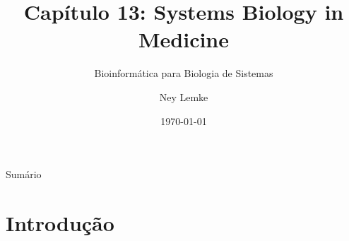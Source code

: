 


\title[Cap. 13: Systems Biology in Medicine]{Capítulo 13: Systems Biology in Medicine}
\subtitle{Bioinformática para Biologia de Sistemas}
\author{Ney Lemke}
\date{\today}



\begin{frame}
\titlepage
\end{frame}

\begin{frame}{Sumário}
\tableofcontents
\end{frame}

\section{Introdução}

